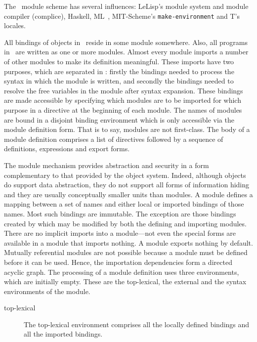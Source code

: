 \label{sec:modules}
%
\begin{optDefinition}
The \eulisp\ module scheme has several influences:
LeLisp's module system and module compiler (complice),
Haskell, ML~, MIT-Scheme's {\tt make-environment} and T's locales.

All bindings of objects in \eulisp\ reside in some module somewhere.  Also, all
programs in \eulisp\ are written as one or more modules.  Almost every module
imports a number of other modules to make its definition meaningful.  These
imports have two purposes, which are separated in \eulisp: firstly the bindings
needed to process the syntax in which the module is written, and secondly the
bindings needed to resolve the free variables in the module after syntax
expansion.  These bindings are made accessible by specifying which modules are
to be imported for which purpose in a directive at the beginning of each module.
The names of modules are bound in a disjoint binding
environment which is only accessible via the module definition form.  That
is to say, modules are not first-class.  The body of a module definition
comprises a list of directives followed by a sequence of definitions,
expressions and export forms.

The module mechanism provides abstraction and security in a form complementary
to that provided by the object system.  Indeed, although objects do support data
abstraction, they do not support all forms of information hiding and they are
usually conceptually smaller units than modules.  A module defines a mapping
between a set of names and either local or imported bindings of those names.
Most such bindings are immutable.  The exception are those bindings created by
 which may be modified by both the defining and importing
modules.  There are no implicit imports into a module---not even the special
forms are available in a module that imports nothing.  A module exports nothing
by default.  Mutually referential modules are not possible because a module must
be defined before it can be used.  Hence, the importation dependencies form a
directed acyclic graph.
%
The processing of a module definition uses three environments, which are
initially empty.  These are the top-lexical, the external and the syntax
environments of the module.
%
\begin{description}
    \item[top-lexical] The top-lexical environment comprises all the locally
    defined bindings and all the imported bindings.


\end{description}
\end{optDefinition}
